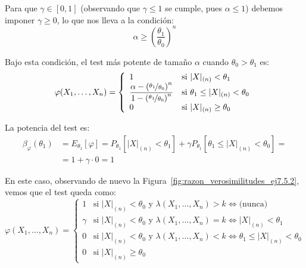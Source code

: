 \begin{ejercicio}
\begin{description}
\begin{description}
            Para que $\gamma \in [0,1]$ (observando que $\gamma\leq 1$ se cumple, pues $\alpha \leq 1$) debemos imponer $\gamma\geq 0$, lo que nos lleva a la condición:
            \begin{equation*}
                \alpha \geq \left(\frac{\theta_1}{\theta_0}\right)^n
            \end{equation*}

            Bajo esta condición, el test más potente de tamaño $\alpha$ cuando $\theta_0 > \theta_1$ es:
            \begin{equation*}
                \varphi(X_1, \ldots, X_n) = \left\{\begin{array}{ll}
                    1 & \text{si\ } |X|_{(n)} < \theta_1 \\
                    \dfrac{\alpha - \left(\nicefrac{\theta_1}{\theta_0}\right)^n}{1 - \left(\nicefrac{\theta_1}{\theta_0}\right)^n} & \text{si\ } \theta_1 \leq |X|_{(n)} < \theta_0 \\
                    0 & \text{si\ } |X|_{(n)} \geq \theta_0
                \end{array}\right.
            \end{equation*}

            La potencia del test es:
            \begin{align*}
                \beta_\varphi(\theta_1) &= E_{\theta_1}[\varphi] = P_{\theta_1}[|X|_{(n)} < \theta_1] + \gamma P_{\theta_1}[\theta_1 \leq |X|_{(n)} < \theta_0] =\\&= 1 + \gamma \cdot 0 = 1
            \end{align*}

            \item[Subcaso $k=\left(\nicefrac{\theta_0}{\theta_1}\right)^n$.] En este caso, observando de nuevo la Figura~\ref{fig:razon_verosimilitudes_ej7.5.2}, vemos que el test queda como:
            \begin{equation*}
                \varphi(X_1, \ldots, X_n) = \left\{\begin{array}{ll}
                    1 & \text{si\ } |X|_{(n)} < \theta_0 \text{\ y\ } \lambda(X_1, \ldots, X_n) > k \iff \text{(nunca)} \\
                    \gamma & \text{si\ } |X|_{(n)} < \theta_0 \text{\ y\ } \lambda(X_1, \ldots, X_n) = k \iff |X|_{(n)} < \theta_1 \\
                    0 & \text{si\ } |X|_{(n)} < \theta_0 \text{\ y\ } \lambda(X_1, \ldots, X_n) < k \iff \theta_1 \leq |X|_{(n)} < \theta_0\\
                    0 & \text{si\ } |X|_{(n)} \geq \theta_0
                \end{array}\right.
            \end{equation*}


\end{description}
\end{description}
\end{ejercicio}
